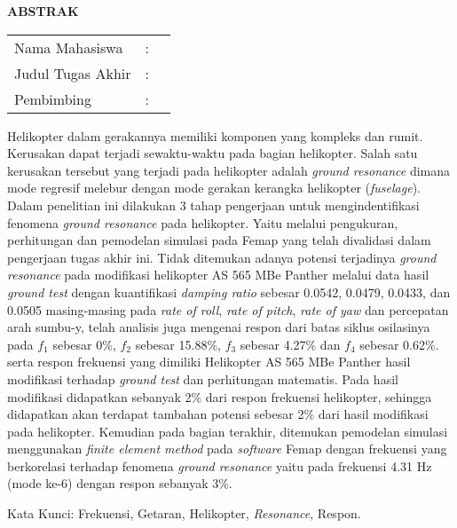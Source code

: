 \begin{center}
  \large\textbf{ABSTRAK}
\end{center}


\vspace{2ex}

\begingroup
\setlength{\tabcolsep}{0pt}

\noindent
\begin{tabularx}{\textwidth}{l >{\centering}m{2em} X}
  Nama Mahasiswa    & : & \name{}         \\

  Judul Tugas Akhir & : & \tatitle{}      \\

  Pembimbing        & : & \advisor{}   \\
  
\end{tabularx}
\endgroup

Helikopter dalam gerakannya memiliki komponen yang kompleks dan rumit. Kerusakan dapat terjadi sewaktu-waktu pada bagian helikopter. Salah satu kerusakan tersebut yang terjadi pada helikopter adalah \textit{ground resonance} dimana mode regresif melebur dengan mode gerakan kerangka helikopter (\textit{fuselage}). Dalam penelitian ini dilakukan 3 tahap pengerjaan untuk mengindentifikasi fenomena \textit{ground resonance} pada helikopter. Yaitu melalui pengukuran, perhitungan dan pemodelan simulasi pada Femap yang telah divalidasi dalam pengerjaan tugas akhir ini. Tidak ditemukan adanya potensi terjadinya \textit{ground resonance} pada modifikasi helikopter AS 565 MBe Panther melalui data hasil \textit{ground test} dengan kuantifikasi \textit{damping ratio} sebesar 0.0542, 0.0479, 0.0433, dan 0.0505 masing-masing pada \textit{rate of roll}, \textit{rate of pitch}, \textit{rate of yaw} dan percepatan arah sumbu-y, telah analisis juga mengenai respon dari batas siklus osilasinya pada $f_1$ sebesar 0$\%$, $f_2$ sebesar 15.88$\%$, $f_3$ sebesar 4.27$\%$ dan $f_4$ sebesar 0.62$\%$. serta respon frekuensi yang dimiliki Helikopter AS 565 MBe Panther hasil modifikasi terhadap \textit{ground test} dan perhitungan matematis. Pada hasil modifikasi didapatkan sebanyak 2$\%$ dari respon frekuensi helikopter, sehingga didapatkan akan terdapat tambahan potensi sebesar 2$\%$ dari hasil modifikasi pada helikopter. Kemudian pada bagian terakhir, ditemukan pemodelan simulasi menggunakan \textit{finite element method} pada \textit{software} Femap dengan frekuensi yang berkorelasi terhadap fenomena \textit{ground resonance} yaitu pada frekuensi 4.31 Hz (mode ke-6) dengan respon sebanyak 3$\%$.

Kata Kunci: Frekuensi, Getaran, Helikopter, \textit{Resonance}, Respon.